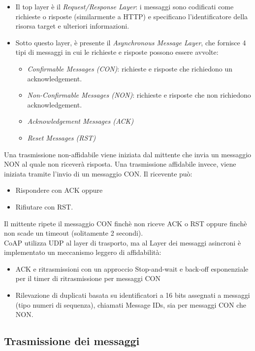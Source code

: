 \documentclass{article}
\begin{document}
\begin{itemize}
    \item Il top layer è il \textit{Request/Response Layer}: i messaggi sono codificati come richieste o risposte (similarmente a HTTP) e specificano l'identificatore della risorsa target e ulteriori informazioni.
    \item Sotto questo layer, è presente il \textit{Asynchronous Message Layer}, che fornisce 4 tipi di messaggi in cui le richieste e risposte possono essere avvolte:
    \begin{itemize}
        \item \textit{Confirmable Messages (CON)}: richieste e risposte che richiedono un acknowledgement.
        \item \textit{Non-Confirmable Messages (NON)}: richieste e risposte che non richiedono acknowledgement.
        \item \textit{Acknowledgement Messages (ACK)}
        \item \textit{Reset Messages (RST)}
    \end{itemize}
\end{itemize}
Una trasmissione non-affidabile viene iniziata dal mittente che invia un messaggio NON al quale non riceverà risposta. Una trasmissione affidabile invece, viene iniziata tramite l'invio di un messaggio CON. Il ricevente può:
\begin{itemize}
    \item Rispondere con ACK oppure
    \item Rifiutare con RST.
\end{itemize}
Il mittente ripete il messaggio CON finchè non riceve ACK o RST oppure finchè non scade un timeout (solitamente 2 secondi). \\ CoAP utilizza UDP al layer di trasporto, ma al Layer dei messaggi asincroni è implementato un meccanismo leggero di affidabilità:
\begin{itemize}
    \item ACK e ritrasmissioni con un approccio Stop-and-wait e back-off esponenziale per il timer di ritrasmissione per messaggi CON
    \item Rilevazione di duplicati basata su identificatori a 16 bits assegnati a messaggi (tipo numeri di sequenza), chiamati Message IDs, sia per messaggi CON che NON.
\end{itemize}

\subsection{Trasmissione dei messaggi}
\end{document}
